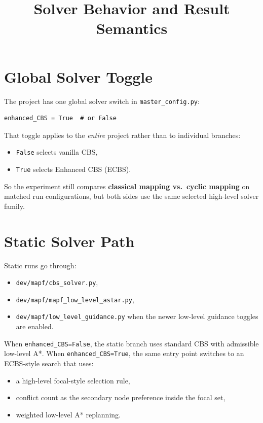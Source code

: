 \documentclass[11pt]{article}
\title{Solver Behavior and Result Semantics}
\author{}
\date{}
\begin{document}
\maketitle

\section{Global Solver Toggle}

The project has one global solver switch in \texttt{master\_config.py}:
\begin{lstlisting}
enhanced_CBS = True  # or False
\end{lstlisting}

That toggle applies to the \emph{entire} project rather than to individual branches:
\begin{itemize}[leftmargin=2em]
    \item \texttt{False} selects vanilla CBS,
    \item \texttt{True} selects Enhanced CBS (ECBS).
\end{itemize}

So the experiment still compares \textbf{classical mapping vs.\ cyclic mapping} on matched run configurations, but both sides use the same selected high-level solver family.

\section{Static Solver Path}

Static runs go through:
\begin{itemize}[leftmargin=2em]
    \item \texttt{dev/mapf/cbs\_solver.py},
    \item \texttt{dev/mapf/mapf\_low\_level\_astar.py},
    \item \texttt{dev/mapf/low\_level\_guidance.py} when the newer low-level guidance toggles are enabled.
\end{itemize}

When \texttt{enhanced\_CBS=False}, the static branch uses standard CBS with admissible low-level A*.
When \texttt{enhanced\_CBS=True}, the same entry point switches to an ECBS-style search that uses:
\begin{itemize}[leftmargin=2em]
    \item a high-level focal-style selection rule,
    \item conflict count as the secondary node preference inside the focal set,
    \item weighted low-level A* replanning.
\end{itemize}
\end{document}
